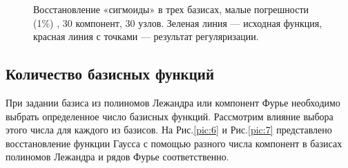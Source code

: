 \begin{figure}[htbp! ]
	\caption{Восстановление «сигмоиды» в трех базисах, малые погрешности (1\%) , 30 компонент, 30 узлов. Зеленая линия --- исходная функция, красная линия с точками --- результат регуляризации.}
	\label{pic:sigmoida_3basis}
\end{figure}
\newpage

\subsection{Количество базисных функций}

При задании базиса из полиномов Лежандра или компонент Фурье необходимо выбрать определенное число базисных функций. Рассмотрим влияние выбора этого числа для каждого из базисов. На Рис.\ref{pic:6} и Рис.\ref{pic:7} представлено восстановление функции Гаусса с помощью разного числа компонент в базисах полиномов Лежандра и рядов Фурье соответственно.

\begin{comment}
\begin{figure}[h! ]
	\label{pic:6}
	\center{\texttt{[image: pic6]} }
	\caption{Восстановление функции Гаусса $e^{-(x-2)^2}$ с помощью 5, 7 и 15 полиномов Лежандра соответственно. Зеленая линия --- исходная функция, красная линия с точками --- результат восстановления.}
\end{figure}


\begin{figure}[h! ]
	\label{pic:7}
	\center{\texttt{[image: pic7]}}
	\caption{Восстановление функции Гаусса $e^{-(x-2)^2}$ с помощью 4, 8 и 14 компонент Фурье соответственно. Зеленая линия --- исходная функция, красная линия с точками --- результат восстановления.}
\end{figure}
\end{comment}

